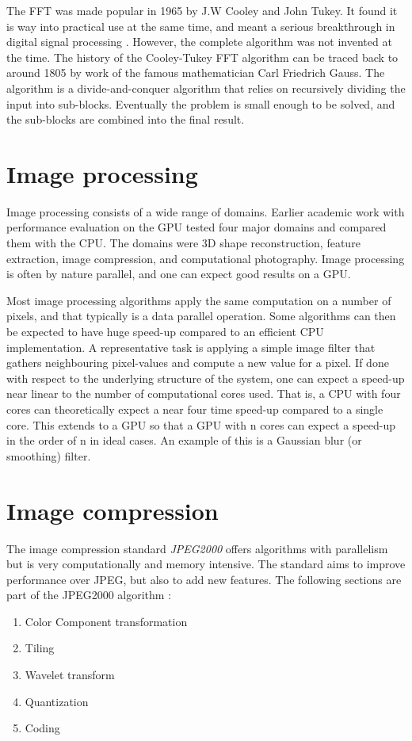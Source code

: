 The FFT was made popular in 1965 \cite{cooley1965algorithm} by J.W Cooley and John Tukey. It found it is way into practical use at the same time, and meant a serious breakthrough in digital signal processing \cite{cooley1969fast, brigham1967fast}. However, the complete algorithm was not invented at the time. The history of the Cooley-Tukey \gls{FFT} algorithm can be traced back to around 1805 by work of the famous mathematician Carl Friedrich Gauss\cite{heideman1984gauss}. The algorithm is a divide-and-conquer algorithm that relies on recursively dividing the input into sub-blocks. Eventually the problem is small enough to be solved, and the sub-blocks are combined into the final result.

\section{Image processing}
Image processing consists of a wide range of domains. Earlier academic work with performance evaluation on the \gls{GPU} \cite{park2011design} tested four major domains and compared them with the \gls{CPU}. The domains were \gls{3D} shape reconstruction, feature extraction, image compression, and computational photography. Image processing is often by nature parallel, and one can expect good results on a \gls{GPU}.

Most image processing algorithms apply the same computation on a number of pixels, and that typically is a data parallel operation. Some algorithms can then be expected to have huge speed-up compared to an efficient \gls{CPU} implementation. A representative task is applying a simple image filter that gathers neighbouring pixel-values and compute a new value for a pixel. If done with respect to the underlying structure of the system, one can expect a speed-up near linear to the number of computational cores used. That is, a \gls{CPU} with four cores can theoretically expect a near four time speed-up compared to a single core. This extends to a \gls{GPU} so that a \gls{GPU} with n cores can expect a speed-up in the order of n in ideal cases. An example of this is a Gaussian blur (or smoothing) filter.

\section{Image compression}
The image compression standard \emph{JPEG2000} offers algorithms with parallelism but is very computationally and memory intensive. The standard aims to improve performance over JPEG, but also to add new features. The following sections are part of the JPEG2000 algorithm \cite{christopoulos2000jpeg2000}:
\begin{enumerate}
	\item Color Component transformation
	\item Tiling
	\item Wavelet transform
	\item Quantization
	\item Coding
\end{enumerate}

